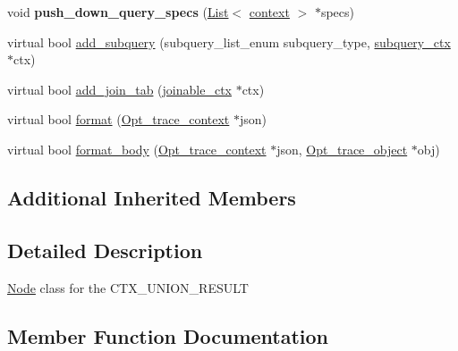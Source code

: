 \begin{DoxyCompactItemize}
void {\bfseries push\+\_\+down\+\_\+query\+\_\+specs} (\mbox{\hyperlink{classList}{List}}$<$ \mbox{\hyperlink{classopt__explain__json__namespace_1_1context}{context}} $>$ $\ast$specs)
\item 
virtual bool \mbox{\hyperlink{classopt__explain__json__namespace_1_1union__result__ctx_a9e6c30603c339d970f2c8609fdda759a}{add\+\_\+subquery}} (subquery\+\_\+list\+\_\+enum subquery\+\_\+type, \mbox{\hyperlink{classopt__explain__json__namespace_1_1subquery__ctx}{subquery\+\_\+ctx}} $\ast$ctx)
\item 
virtual bool \mbox{\hyperlink{classopt__explain__json__namespace_1_1union__result__ctx_a3c7d8284cb5c779f33f344a986f6a4f6}{add\+\_\+join\+\_\+tab}} (\mbox{\hyperlink{classopt__explain__json__namespace_1_1joinable__ctx}{joinable\+\_\+ctx}} $\ast$ctx)
\item 
virtual bool \mbox{\hyperlink{classopt__explain__json__namespace_1_1union__result__ctx_ad9dbb8c384b4cc802656fed173589e5c}{format}} (\mbox{\hyperlink{classOpt__trace__context}{Opt\+\_\+trace\+\_\+context}} $\ast$json)
\item 
virtual bool \mbox{\hyperlink{classopt__explain__json__namespace_1_1union__result__ctx_a530209b64dc40a9e682f78cd550b1047}{format\+\_\+body}} (\mbox{\hyperlink{classOpt__trace__context}{Opt\+\_\+trace\+\_\+context}} $\ast$json, \mbox{\hyperlink{classOpt__trace__object}{Opt\+\_\+trace\+\_\+object}} $\ast$obj)
\end{DoxyCompactItemize}
\subsection*{Additional Inherited Members}


\subsection{Detailed Description}
\mbox{\hyperlink{classNode}{Node}} class for the C\+T\+X\+\_\+\+U\+N\+I\+O\+N\+\_\+\+R\+E\+S\+U\+LT 

\subsection{Member Function Documentation}
\mbox{\label{classopt__explain__json__namespace_1_1union__result__ctx_a3c7d8284cb5c779f33f344a986f6a4f6}} 
